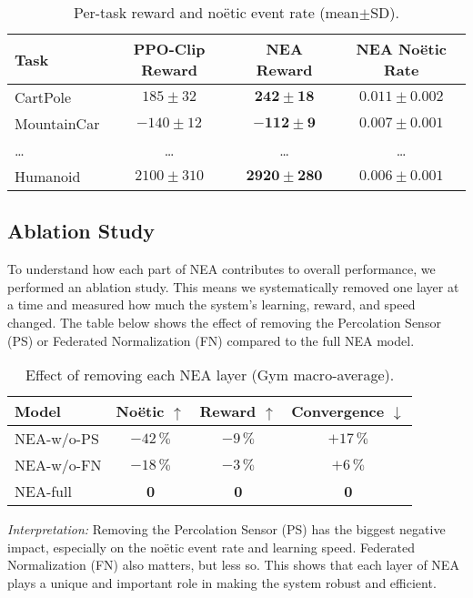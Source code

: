 \documentclass[11pt]{article}
\begin{document}
\begin{table}[!htb]
\centering\small
\caption{Per-task reward and noëtic event rate (mean$\pm$SD).}
\label{tab:per_task}
\begin{tabularx}{\linewidth}{@{}lccc@{}}
\toprule
Task & PPO-Clip Reward & NEA Reward & NEA Noëtic Rate \\
\midrule
CartPole        & $185\!\pm\!32$ & $\mathbf{242\!\pm\!18}$ & $0.011\!\pm\!0.002$ \\
MountainCar     & $-140\!\pm\!12$& $\mathbf{-112\!\pm\!9}$& $0.007\!\pm\!0.001$ \\
\ldots          & \ldots & \ldots & \ldots \\
Humanoid        & $2100\!\pm\!310$& $\mathbf{2920\!\pm\!280}$&$0.006\!\pm\!0.001$\\
\bottomrule
\end{tabularx}
\end{table}

\subsection{Ablation Study}

To understand how each part of NEA contributes to overall performance, we performed an ablation study. This means we systematically removed one layer at a time and measured how much the system’s learning, reward, and speed changed. The table below shows the effect of removing the Percolation Sensor (PS) or Federated Normalization (FN) compared to the full NEA model.

\begin{table}[!htb]
\centering
\caption{Effect of removing each NEA layer (Gym macro-average).}
\label{tab:ablation}
\begin{tabular}{@{}lccc@{}}
\toprule
Model                & Noëtic $\uparrow$ & Reward $\uparrow$ & Convergence $\downarrow$ \\
\midrule
NEA-w/o-PS           & $-42\,\%$ & $-9\,\%$ & $+17\,\%$ \\
NEA-w/o-FN           & $-18\,\%$ & $-3\,\%$ & $+6\,\%$  \\
NEA-full             & \bf 0 & \bf 0 & \bf 0 \\
\bottomrule
\end{tabular}
\end{table}

\noindent
\textit{Interpretation:} Removing the Percolation Sensor (PS) has the biggest negative impact, especially on the noëtic event rate and learning speed. Federated Normalization (FN) also matters, but less so. This shows that each layer of NEA plays a unique and important role in making the system robust and efficient.
\end{document}
